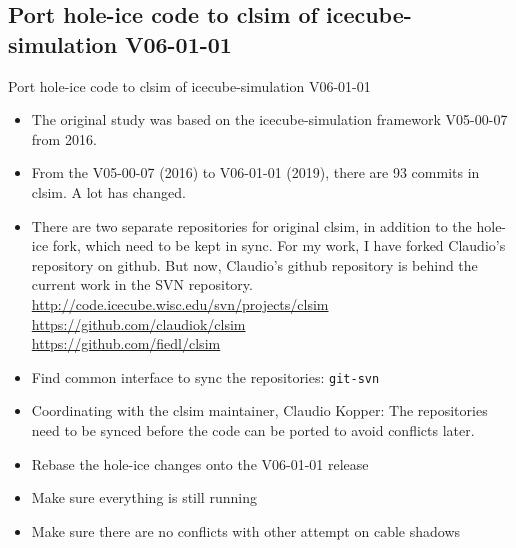 \subsection{\inprogress Port hole-ice code to clsim of icecube-simulation V06-01-01}
\begin{frame}{\inprogress Port hole-ice code to clsim of icecube-simulation V06-01-01}
  \begin{itemize}
    \item The original study was based on the icecube-simulation framework V05-00-07 from 2016.
    \item From the V05-00-07 (2016) to V06-01-01 (2019), there are 93 commits in clsim. A lot has changed.
    \item There are two separate repositories for original clsim, in addition to the hole-ice fork, which need to be kept in sync. For my work, I have forked Claudio's repository on github. But now, Claudio's github repository is behind the current work in the SVN repository. \\
      \url{http://code.icecube.wisc.edu/svn/projects/clsim} \\
      \url{https://github.com/claudiok/clsim} \\
      \url{https://github.com/fiedl/clsim}
    \item[\done] Find common interface to sync the repositories: \texttt{git-svn}
    \item[\inprogress] Coordinating with the clsim maintainer, Claudio Kopper: The repositories need to be synced before the code can be ported to avoid conflicts later.
    \item[\tobedone] Rebase the hole-ice changes onto the V06-01-01 release
    \item[\tobedone] Make sure everything is still running
    \item[\tobedone] Make sure there are no conflicts with other attempt on cable shadows
  \end{itemize}
\end{frame}

